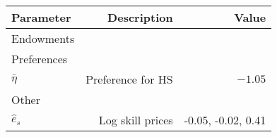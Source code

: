 \begin{tabular}{lrr}
\hline
Parameter & Description  & Value  \\
\hline
Endowments &   &   \\
Preferences &   &   \\
$\bar{\eta}$ & Preference for HS  & $-1.05$  \\
Other &   &   \\
$\hat{e}_{s}$ & Log skill prices  & -0.05, -0.02, 0.41  \\
\hline
\end{tabular}%
